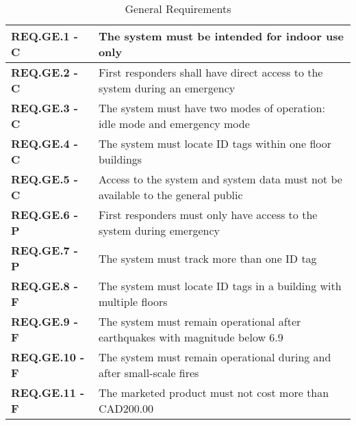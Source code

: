 \bgroup
\def\arraystretch{1.5}
\begin{table}[H]
\centering
\begin{tabular}{ | m{3.5cm} | m{12.5cm} | }
 \hline
 \textbf{ REQ.GE.1 - C } & The system must be intended for indoor use only \\
\hline
 \textbf{ REQ.GE.2 - C } & First responders shall have direct access to the system during an emergency \\
\hline
 \textbf{ REQ.GE.3 - C } & The system must have two modes of operation: idle mode and emergency mode \\
\hline
 \textbf{ REQ.GE.4 - C } & The system must locate ID tags within one floor buildings \\
\hline
 \textbf{ REQ.GE.5 - C } & Access to the system and system data must not be available to the general public \\
\hline
 \textbf{ REQ.GE.6 - P } & First responders must only have access to the system during emergency \\
\hline
 \textbf{ REQ.GE.7 - P } & The system must track more than one ID tag \\
\hline
 \textbf{ REQ.GE.8 - F } & The system must locate ID tags in a building with multiple floors \\
\hline
 \textbf{ REQ.GE.9 - F } & The system must remain operational after earthquakes with magnitude below 6.9 \\
\hline
 \textbf{ REQ.GE.10 - F } & The system must remain operational during and after small-scale fires \\
\hline
 \textbf{ REQ.GE.11 - F } & The marketed product must not cost more than CAD200.00 \\
\hline
\end{tabular}
\caption{General Requirements}
\end{table}

\break
